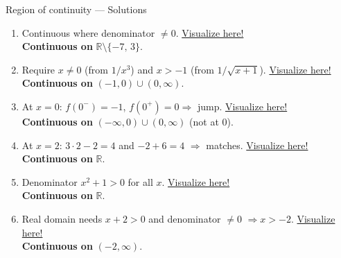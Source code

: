 \documentclass[9pt]{beamer}
\begin{document}
\begin{frame}{Region of continuity — Solutions}

\small
\begin{enumerate}[leftmargin=0.5cm, label=(\alph*), rightmargin=0.2cm]

\item %
Continuous where denominator $\neq0$. \hfill \href{https://www.desmos.com/calculator/kuxfe3qfwg}{Visualize here!} \\
\textbf{Continuous on } $\mathbb{R}\setminus\{-7,\,3\}$.

\item %
Require $x\neq0$ (from $1/x^3$) and $x>-1$ (from $1/\sqrt{x+1}$). \hfill \href{https://www.desmos.com/calculator/vv2ydbpybh}{Visualize here!} \\
\textbf{Continuous on } $(-1,0)\cup(0,\infty)$.

\item %
At $x=0$: $f(0^-)= -1$, $f(0^+)=0\Rightarrow$ jump. \hfill \href{https://www.desmos.com/calculator/zyrujcbb61}{Visualize here!} \\
\textbf{Continuous on } $(-\infty,0)\cup(0,\infty)$ (not at $0$).

\item 
At $x=2$: $3\cdot2-2=4$ and $-2+6=4$ $\Rightarrow$ matches. \hfill \href{https://www.desmos.com/calculator/edauinwxhx}{Visualize here!} \\
\textbf{Continuous on } $\mathbb{R}$.

\item 
Denominator $x^2+1>0$ for all $x$. \hfill \href{https://www.desmos.com/calculator/fnajeqhjkq}{Visualize here!} \\
\textbf{Continuous on } $\mathbb{R}$.

\item %
Real domain needs $x+2>0$ and denominator $\neq0$ $\Rightarrow x>-2$. \hfill \href{https://www.desmos.com/calculator/kvz86ysozz}{Visualize here!} \\
\textbf{Continuous on } $(-2,\infty)$.

\end{enumerate}

\end{frame}
\end{document}
